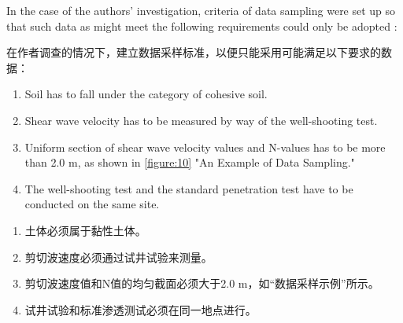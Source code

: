 
\begin{paracol}{2}

    In the case of the authors' investigation, criteria of data sampling were set up so that such data as might meet the following requirements could only be adopted :

    \switchcolumn

    在作者调查的情况下，建立数据采样标准，以便只能采用可能满足以下要求的数据：

    \switchcolumn*

    \begin{enumerate}
        \item Soil has to fall under the category of cohesive soil.
        \item Shear wave velocity has to be measured by way of the well-shooting test.
        \item Uniform section of shear wave velocity values and N-values has to be more than 2.0 m, as shown in \autoref{figure:10} "An Example of Data Sampling."
        \item The well-shooting test and the standard penetration test have to be conducted on the same site.
    \end{enumerate}

    \switchcolumn
    \begin{enumerate}
        \item 土体必须属于黏性土体。
        \item 剪切波速度必须通过试井试验来测量。
        \item 剪切波速度值和N值的均匀截面必须大于2.0 m，如“数据采样示例”所示。
        \item 试井试验和标准渗透测试必须在同一地点进行。
    \end{enumerate}
    
\end{paracol}



